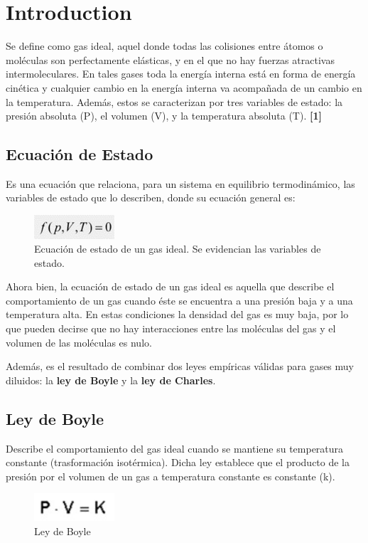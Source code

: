 \documentclass[journal,transmag]{IEEEtran}
\begin{document}
\section{Introduction}
	
	Se define como gas ideal, aquel donde todas las colisiones entre átomos o moléculas son perfectamente elásticas, y en el que no hay fuerzas atractivas intermoleculares. En tales gases toda la energía interna está en forma de energía cinética y cualquier cambio en la energía interna va acompañada de un cambio en la temperatura. Además, estos se caracterizan por tres variables de estado: la presión absoluta (P), el volumen (V), y la temperatura absoluta (T).  \textbf{[1]}
	
\subsection{Ecuación de Estado}
Es una ecuación que relaciona, para un sistema en equilibrio termodinámico, las variables de estado que lo describen, donde su ecuación general es: 
 \begin{figure}[!h]
			\center
			\includegraphics[width=3cm]{img/1.jpeg}
			\caption{Ecuación de estado de un gas ideal. Se evidencian las 	variables de estado.}
			\label{f1}
		\end{figure}

Ahora bien, la ecuación de estado de un gas ideal es aquella que describe el comportamiento de un gas cuando éste se encuentra a una presión baja y a una temperatura alta. En estas condiciones la densidad del gas es muy baja, por lo que pueden decirse que no hay interacciones entre las moléculas del gas y el volumen de las moléculas es nulo.

Además, es el resultado de combinar dos leyes empíricas válidas para gases muy diluidos: la \textbf{ley de Boyle} y la \textbf{ley de Charles}.

\subsection{\textbf{Ley de Boyle}}
	Describe el comportamiento del gas ideal cuando se mantiene su temperatura constante (trasformación isotérmica). Dicha ley establece que el producto de la presión por el volumen de un gas a temperatura constante es constante (k). 
	\begin{figure}[!h]
				\center
				\includegraphics[width=3cm]{img/2.jpeg}
				\caption{Ley de Boyle}
				\label{f2}
	\end{figure}
\end{document}
